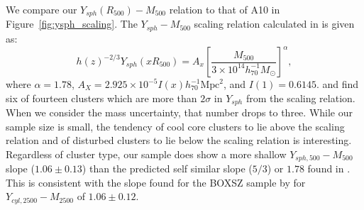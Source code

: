 \documentclass[iop,numberedappendix,apj]{emulateapj}
\begin{document}
We compare our $Y_{sph}(R_{500}) - M_{500}$ relation to that of A10 in Figure~\ref{fig:ysph_scaling}.
The $Y_{sph} - M_{500}$ scaling relation calculated in  is given as:
\begin{equation}
  h(z)^{-2/3} Y_{sph}(x R_{500}) = A_x \left[ \frac{M_{500}}{3 \times 10^{14} h_{70}^{-1} M_{\odot}} \right] ^{\alpha} ,
  \label{eqn:ysph_scaling}
\end{equation}
where $\alpha = 1.78$, $A_X = 2.925 \times 10^{-5} I(x) h_{70}^{-1}\text{Mpc}^2$, and $I(1) = 0.6145$.
and find six of fourteen clusters which are more than $2 \sigma$ in $Y_{sph}$ from the scaling relation.
When we consider the mass uncertainty, that number drops to three. While our sample size is small, the
tendency of cool core clusters to lie above the scaling relation and of disturbed clusters to lie below the
scaling relation is interesting. Regardless of cluster type, our sample does show a more shallow $Y_{sph,500}-M_{500}$ slope
($1.06\pm0.13$) than the predicted self similar slope ($5/3$) or $1.78$ found in . 
This is consistent with the slope found for the BOXSZ sample by \citet{czakon2015} for $Y_{cyl,2500} - M_{2500}$ of $1.06\pm0.12$.



\end{document}
